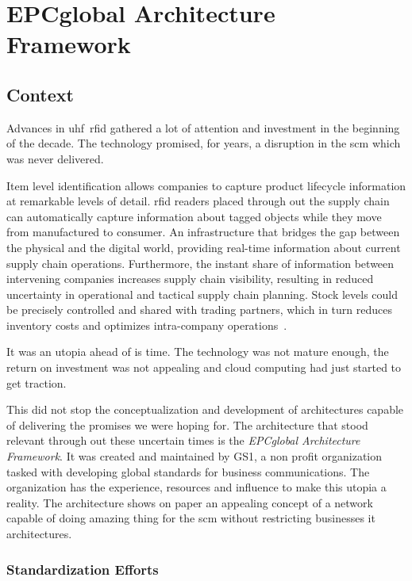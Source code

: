\chapter{EPCglobal Architecture Framework}

\section{Context}

Advances in \acs{uhf}~\acs{rfid} gathered a lot of attention and investment in the beginning of the decade. The technology promised, for years, a disruption in the \ac{scm} which was never delivered. 

Item level identification allows companies to capture product lifecycle information at remarkable levels of detail. \ac{rfid} readers placed through out the supply chain can automatically capture information about tagged objects while they move from manufactured to consumer.
An infrastructure that bridges the gap between the physical and the digital world, providing real-time information about current supply chain operations.
Furthermore, the instant share of information between intervening companies increases supply chain visibility, resulting in reduced uncertainty in operational and tactical supply chain planning.
Stock levels could be precisely controlled and shared with trading partners, which in turn reduces inventory costs and optimizes intra-company operations~\cite{lorenzDiscoveryServicesEPC2011, simchi-leviCadeiasSuprimentosProjeto2003}.

It was an utopia ahead of is time. The technology was not mature enough, the return on investment was not appealing and cloud computing had just started to get traction.

This did not stop the conceptualization and development of architectures capable of delivering the promises we were hoping for.
The architecture that stood relevant through out these uncertain times is the \emph{EPCglobal Architecture Framework}.
It was created and maintained by GS1, a non profit organization tasked with developing global standards for business communications.
The organization has the experience, resources and influence to make this utopia a reality.
The architecture shows on paper an appealing concept of a network capable of doing amazing thing for the \ac{scm} without restricting businesses \ac{it} architectures.

\subsection{Standardization Efforts}

